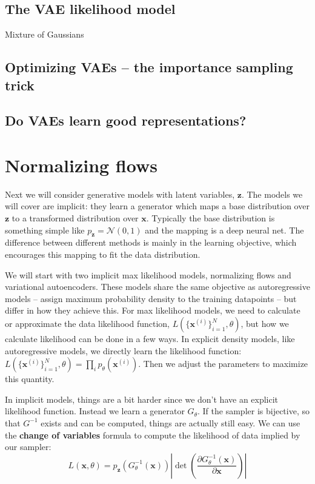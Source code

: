 \subsection{The VAE likelihood model}

Mixture of Gaussians

\subsection{Optimizing VAEs -- the importance sampling trick}


\subsection{Do VAEs learn good representations?}



\section{Normalizing flows}

Next we will consider generative models with latent variables, $\mathbf{z}$. The models we will cover are implicit: they learn a generator which maps a base distribution over $\mathbf{z}$ to a transformed distribution over $\mathbf{x}$. Typically the base distribution is something simple like $p_{\mathbf{z}} = \mathcal{N}(0,1)$ and the mapping is a deep neural net. The difference between different methods is mainly in the learning objective, which encourages this mapping to fit the data distribution.

We will start with two implicit max likelihood models, normalizing flows and variational autoencoders. These models share the same objective as autoregressive models -- assign maximum probability density to the training datapoints -- but differ in how they achieve this. For max likelihood models, we need to calculate or approximate the data likelihood function, $L(\{\mathbf{x}^{(i)}\}_{i=1}^N, \theta)$, but how we calculate likelihood can be done in a few ways. In explicit density models, like autoregressive models, we directly learn the likelihood function: $L(\{\mathbf{x}^{(i)}\}_{i=1}^N, \theta) = \prod_i p_{\theta}(\mathbf{x}^{(i)})$. Then we adjust the parameters to maximize this quantity.

In implicit models, things are a bit harder since we don't have an explicit likelihood function. Instead we learn a generator $G_{\theta}$. If the sampler is bijective, so that $G^{-1}$ exists and can be computed, things are actually still easy. We can use the {\bf change of variables} formula to compute the likelihood of data implied by our sampler:
\begin{equation*}
    L(\mathbf{x}, \theta) = p_{\mathbf{z}}(G_{\theta}^{-1}(\mathbf{x}))|\det(\frac{\partial G_{\theta}^{-1}(\mathbf{x})}{\partial \mathbf{x}})| 
\end{equation*}


